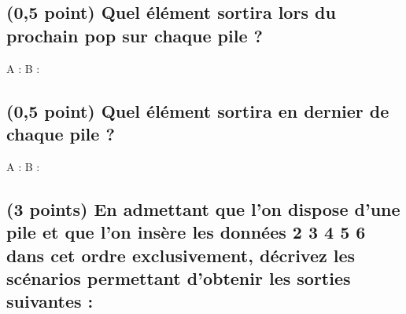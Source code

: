 \documentclass[11pt,a4paper]{article}
\begin{document}
\bigskip


\subsection{(0,5 point) Quel élément sortira lors du prochain \og pop \fg{} sur chaque pile ? }

\bigskip
\bigskip

\begin{Large}
A :  \hspace{8cm}  B :
\end{Large}

\bigskip
\bigskip


\subsection{(0,5 point) Quel élément sortira en dernier de chaque pile ? }

\bigskip
\bigskip

\begin{Large}
A :  \hspace{8cm}  B :
\end{Large}

\bigskip
\bigskip



\hspace{0pt}
\vfill

\newpage

\vfillFirst

\subsection{(3 points) En admettant que l'on dispose d'une pile et que l'on insère les données  2 3 4 5 6 \fg{} dans cet ordre exclusivement, décrivez les scénarios permettant d'obtenir les sorties suivantes : }
\end{document}
